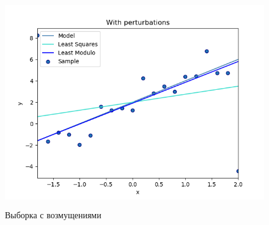 \documentclass[../body.tex]{subfiles}
\begin{document}
	\begin{figure}[H]
		\centering
		\includegraphics[width = 12cm, height = 9cm]{img/With perturbations.png}
		\caption{Выборка с возмущениями}
		\label{with}
	\end{figure}
\end{document}
